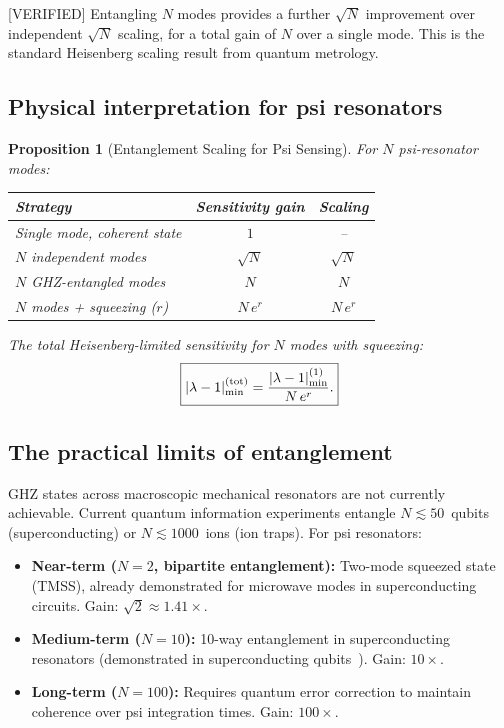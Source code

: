 \documentclass[11pt,twocolumn]{article}
\newcommand{\lam}{\lambda}
\newtheorem{proposition}[theorem]{Proposition}
\theoremstyle{definition}
\theoremstyle{remark}
\begin{document}
[VERIFIED] Entangling $N$ modes provides a further $\sqrt{N}$ improvement
over independent $\sqrt{N}$ scaling, for a total gain of $N$ over a single
mode.  This is the standard Heisenberg scaling result from quantum metrology.

\subsection{Physical interpretation for psi resonators}
\label{sec:entanglement_physical}

\begin{proposition}[Entanglement Scaling for Psi Sensing]
\label{prop:entanglement_scaling}
For $N$ psi-resonator modes:
\begin{center}
\begin{tabular}{lcc}
\toprule
Strategy & Sensitivity gain & Scaling \\
\midrule
Single mode, coherent state & $1$ & -- \\
$N$ independent modes & $\sqrt{N}$ & $\sqrt{N}$ \\
$N$ GHZ-entangled modes & $N$ & $N$ \\
$N$ modes + squeezing ($r$) & $N\,e^r$ & $N\,e^r$ \\
\bottomrule
\end{tabular}
\end{center}
The total Heisenberg-limited sensitivity for $N$ modes with squeezing:
\begin{equation}
\boxed{
|\lam-1|_{\rm min}^{(\rm tot)}
= \frac{|\lam-1|_{\rm min}^{(1)}}{N\,e^r}.
}
\label{eq:total_sensitivity}
\end{equation}
\end{proposition}

\subsection{The practical limits of entanglement}
\label{sec:entanglement_limits}

GHZ states across macroscopic mechanical resonators are not currently
achievable.  Current quantum information experiments entangle
$N \lesssim 50$~qubits (superconducting) or $N \lesssim 1000$~ions
(ion traps).  For psi resonators:

\begin{itemize}[nosep]
\item \textbf{Near-term ($N = 2$, bipartite entanglement):}
      Two-mode squeezed state (TMSS), already demonstrated for microwave
      modes in superconducting circuits.  Gain: $\sqrt{2} \approx 1.41\times$.
\item \textbf{Medium-term ($N = 10$):}
      10-way entanglement in superconducting resonators (demonstrated in
      superconducting qubits~\cite{Song2019}).  Gain: $10\times$.
\item \textbf{Long-term ($N = 100$):}
      Requires quantum error correction to maintain coherence over psi
      integration times.  Gain: $100\times$.
\end{itemize}
\end{document}

